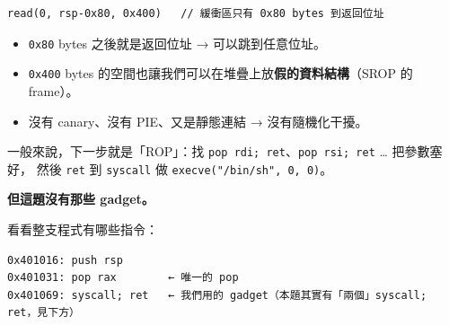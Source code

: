 \documentclass[10pt,a4paper]{article}
\providecommand{\tightlist}{%
  \setlength{\itemsep}{0pt}\setlength{\parskip}{0pt}}
\begin{document}
\begin{Verbatim}[breaklines=true,breakanywhere=true,breakautoindent=false,fontsize=\fontsize{7.0}{9.5}\selectfont]
read(0, rsp-0x80, 0x400)   // 緩衝區只有 0x80 bytes 到返回位址
\end{Verbatim}

\begin{itemize}
\tightlist
\item
  \texttt{0x80} bytes 之後就是返回位址 → 可以跳到任意位址。
\item
  \texttt{0x400} bytes
  的空間也讓我們可以在堆疊上放\textbf{假的資料結構}（SROP 的 frame）。
\item
  沒有 canary、沒有 PIE、又是靜態連結 → 沒有隨機化干擾。
\end{itemize}

一般來說，下一步就是「ROP」：找
\texttt{pop\ \allowbreak{}rdi;\ \allowbreak{}ret}、\texttt{pop\ \allowbreak{}rsi;\ \allowbreak{}ret} \ldots{} 把參數塞好，
然後 \texttt{ret} 到 \texttt{syscall} 做
\texttt{execve("/\allowbreak{}bin/\allowbreak{}sh",\allowbreak{}\ \allowbreak{}0,\allowbreak{}\ \allowbreak{}0)}。

\textbf{但這題沒有那些 gadget。}

看看整支程式有哪些指令：

\begin{Verbatim}[breaklines=true,breakanywhere=true,breakautoindent=false,fontsize=\fontsize{7.0}{9.5}\selectfont]
0x401016: push rsp
0x401031: pop rax        ← 唯一的 pop
0x401069: syscall; ret   ← 我們用的 gadget（本題其實有「兩個」syscall; ret，見下方）
\end{Verbatim}
\end{document}
